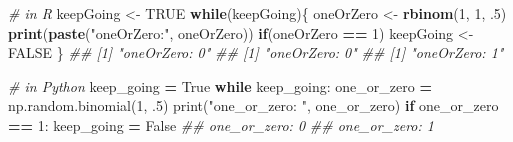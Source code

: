 \documentclass[12pt,krantz2]{krantz}
\makeatletter
\newenvironment{Shaded}{\begin{snugshade}}{\end{snugshade}}
\newcommand{\BuiltInTok}[1]{#1}
\newcommand{\CommentTok}[1]{\textcolor[rgb]{0.37,0.37,0.37}{\textit{#1}}}
\newcommand{\ControlFlowTok}[1]{\textcolor[rgb]{0.27,0.27,0.27}{\textbf{#1}}}
\newcommand{\DecValTok}[1]{\textcolor[rgb]{0.06,0.06,0.06}{#1}}
\newcommand{\FloatTok}[1]{\textcolor[rgb]{0.06,0.06,0.06}{#1}}
\newcommand{\KeywordTok}[1]{\textcolor[rgb]{0.27,0.27,0.27}{\textbf{#1}}}
\newcommand{\NormalTok}[1]{#1}
\newcommand{\OperatorTok}[1]{\textcolor[rgb]{0.43,0.43,0.43}{\textbf{#1}}}
\newcommand{\OtherTok}[1]{\textcolor[rgb]{0.37,0.37,0.37}{#1}}
\newcommand{\StringTok}[1]{\textcolor[rgb]{0.5,0.5,0.5}{#1}}
\newcommand{\VariableTok}[1]{\textcolor[rgb]{0,0,0}{#1}}
\newenvironment{kframe}{%
\medskip{}
\setlength{\fboxsep}{.8em}
 \def\at@end@of@kframe{}%
 \ifinner\ifhmode%
  \def\at@end@of@kframe{\end{minipage}}%
  \begin{minipage}{\columnwidth}%
 \fi\fi%
 \def\FrameCommand##1{\hskip\@totalleftmargin \hskip-\fboxsep
 \colorbox{shadecolor}{##1}\hskip-\fboxsep
     \hskip-\linewidth \hskip-\@totalleftmargin \hskip\columnwidth}%
 \MakeFramed {\advance\hsize-\width
   \@totalleftmargin\z@ \linewidth\hsize
   \@setminipage}}%
 {\par\unskip\endMakeFramed%
 \at@end@of@kframe}
\renewenvironment{Shaded}{\begin{kframe}}{\end{kframe}}
\makeatother
\begin{document}
\begin{Shaded}
\begin{Highlighting}[]
\CommentTok{# in R}
\NormalTok{keepGoing <-}\StringTok{ }\OtherTok{TRUE}
\ControlFlowTok{while}\NormalTok{(keepGoing)\{}
\NormalTok{  oneOrZero <-}\StringTok{ }\KeywordTok{rbinom}\NormalTok{(}\DecValTok{1}\NormalTok{, }\DecValTok{1}\NormalTok{, }\FloatTok{.5}\NormalTok{)}
  \KeywordTok{print}\NormalTok{(}\KeywordTok{paste}\NormalTok{(}\StringTok{"oneOrZero:"}\NormalTok{, oneOrZero))}
  \ControlFlowTok{if}\NormalTok{(oneOrZero }\OperatorTok{==}\StringTok{ }\DecValTok{1}\NormalTok{)}
\NormalTok{    keepGoing <-}\StringTok{ }\OtherTok{FALSE}
\NormalTok{\}}
\CommentTok{## [1] "oneOrZero: 0"}
\CommentTok{## [1] "oneOrZero: 0"}
\CommentTok{## [1] "oneOrZero: 1"}
\end{Highlighting}
\end{Shaded}

\begin{Shaded}
\begin{Highlighting}[]
\CommentTok{# in Python}
\NormalTok{keep_going }\OperatorTok{=} \VariableTok{True}
\ControlFlowTok{while}\NormalTok{ keep_going:}
\NormalTok{    one_or_zero }\OperatorTok{=}\NormalTok{ np.random.binomial(}\DecValTok{1}\NormalTok{, }\FloatTok{.5}\NormalTok{) }
    \BuiltInTok{print}\NormalTok{(}\StringTok{"one_or_zero: "}\NormalTok{, one_or_zero)}
    \ControlFlowTok{if}\NormalTok{ one_or_zero }\OperatorTok{==} \DecValTok{1}\NormalTok{:}
\NormalTok{        keep_going }\OperatorTok{=} \VariableTok{False}
\CommentTok{## one_or_zero:  0}
\CommentTok{## one_or_zero:  1}
\end{Highlighting}
\end{Shaded}
\end{document}
